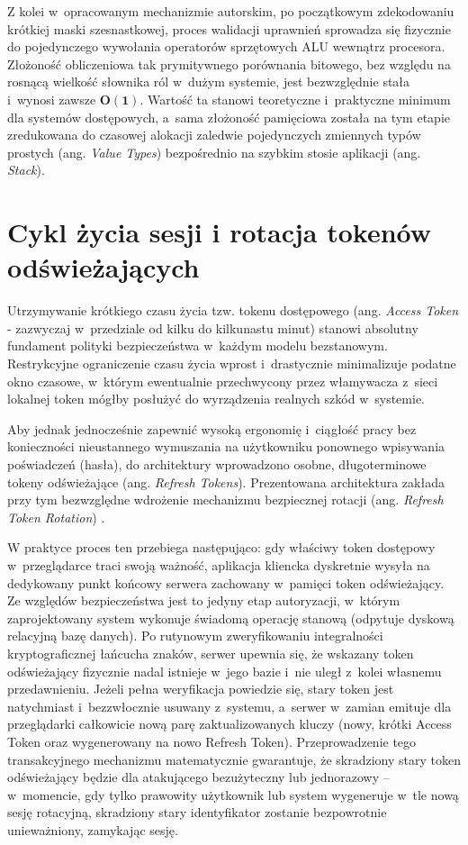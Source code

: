 \documentclass{SGGW-thesis}
\begin{document}
Z kolei w~opracowanym mechanizmie autorskim, po początkowym zdekodowaniu krótkiej maski szesnastkowej, proces walidacji uprawnień sprowadza się fizycznie do pojedynczego wywołania operatorów sprzętowych ALU wewnątrz procesora. Złożoność obliczeniowa tak prymitywnego porównania bitowego, bez względu na rosnącą wielkość słownika ról w~dużym systemie, jest bezwzględnie stała i~wynosi zawsze $\boldsymbol{O(1)}$. Wartość ta stanowi teoretyczne i~praktyczne minimum dla systemów dostępowych, a~sama złożoność pamięciowa została na tym etapie zredukowana do czasowej alokacji zaledwie pojedynczych zmiennych typów prostych (ang. \textit{Value Types}) bezpośrednio na szybkim stosie aplikacji (ang. \textit{Stack}).

\section{Cykl życia sesji i rotacja tokenów odświeżających}

Utrzymywanie krótkiego czasu życia tzw. tokenu dostępowego (ang. \textit{Access Token} - zazwyczaj w~przedziale od kilku do kilkunastu minut) stanowi absolutny fundament polityki bezpieczeństwa w~każdym modelu bezstanowym. Restrykcyjne ograniczenie czasu życia wprost i~drastycznie minimalizuje podatne okno czasowe, w~którym ewentualnie przechwycony przez włamywacza z~sieci lokalnej token mógłby posłużyć do wyrządzenia realnych szkód w~systemie.

Aby jednak jednocześnie zapewnić wysoką ergonomię i~ciągłość pracy bez konieczności nieustannego wymuszania na użytkowniku ponownego wpisywania poświadczeń (hasła), do architektury wprowadzono osobne, długoterminowe tokeny odświeżające (ang. \textit{Refresh Tokens}). Prezentowana architektura zakłada przy tym bezwzględne wdrożenie mechanizmu bezpiecznej rotacji (ang. \textit{Refresh Token Rotation}) \cite{oauth2}. 

W praktyce proces ten przebiega następująco: gdy właściwy token dostępowy w~przeglądarce traci swoją ważność, aplikacja kliencka dyskretnie wysyła na dedykowany punkt końcowy serwera zachowany w~pamięci token odświeżający. Ze względów bezpieczeństwa jest to jedyny etap autoryzacji, w~którym zaprojektowany system wykonuje świadomą operację stanową (odpytuje dyskową relacyjną bazę danych). Po rutynowym zweryfikowaniu integralności kryptograficznej łańcucha znaków, serwer upewnia się, że wskazany token odświeżający fizycznie nadal istnieje w~jego bazie i~nie uległ z~kolei własnemu przedawnieniu. Jeżeli pełna weryfikacja powiedzie się, stary token jest natychmiast i~bezzwłocznie usuwany z~systemu, a~serwer w~zamian emituje dla przeglądarki całkowicie nową parę zaktualizowanych kluczy (nowy, krótki Access Token oraz wygenerowany na nowo Refresh Token). Przeprowadzenie tego transakcyjnego mechanizmu matematycznie gwarantuje, że skradziony stary token odświeżający będzie dla atakującego bezużyteczny lub jednorazowy – w~momencie, gdy tylko prawowity użytkownik lub system wygeneruje w~tle nową sesję rotacyjną, skradziony stary identyfikator zostanie bezpowrotnie unieważniony, zamykając sesję.
\end{document}
